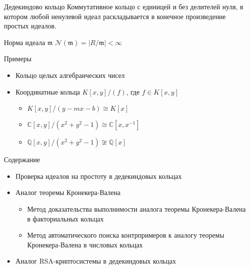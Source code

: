 \documentclass[8pt, xcolor=x11names]{beamer}
\begin{document}
\begin{frame}
    \begin{block}{Дедекиндово кольцо}
        Коммутативное кольцо с единицей и без делителей нуля, в котором любой ненулевой идеал раскладывается в конечное произведение простых идеалов.
    \end{block}

    \begin{block}{Норма идеала $\mathfrak{m}$}
        $\mathcal{N}(\mathfrak{m}) = |R/\mathfrak{m}| < \infty$
    \end{block}

    \begin{block}{Примеры}
        \begin{itemize}
            \item Кольцо целых алгебраических чисел
            
            \item Координатные кольца $K[x, y]/(f)$, где $f \in K[x, y]$
            \begin{itemize}
                \item $K[x, y]/(y - mx - b) \cong K[x]$
                \item $\mathbb{C}[x, y]/(x^2 + y^2 - 1) \cong \mathbb{C}[x, x^{-1}]$
                \item $\mathbb{Q}[x, y]/(x^2 + y^2 - 1) \not\cong \mathbb{Q}[x]$
            \end{itemize}
        \end{itemize}
    \end{block}
\end{frame}

\begin{frame}{Содержание}
    \begin{block_notitle}{}
        \begin{itemize}
            \item Проверка идеалов на простоту в дедекиндовых кольцах
            
            \item Аналог теоремы Кронекера-Валена
            \begin{itemize}
                \item Метод доказательства выполнимости аналога теоремы Кронекера-Валена в факториальных кольцах

                \item Метод автоматического поиска контрпримеров к аналогу теоремы Кронекера-Валена в числовых кольцах
            \end{itemize}
            
            \item Аналог RSA-криптосистемы в дедекиндовых кольцах
        \end{itemize}
    \end{block_notitle}
\end{frame}
\end{document}
